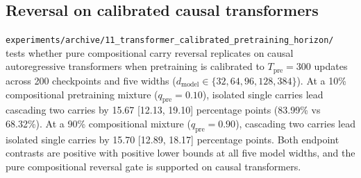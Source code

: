 \subsection{Reversal on calibrated causal transformers}
\label{sec:exp11_ranking}
\texttt{experiments/archive/11\_transformer\_calibrated\_pretraining\_horizon/} tests whether pure compositional carry reversal replicates on causal autoregressive transformers when pretraining is calibrated to $T_{\text{pre}}=300$ updates across 200 checkpoints and five widths ($d_{\text{model}} \in \{32, 64, 96, 128, 384\}$).
At a 10\% compositional pretraining mixture ($q_{\text{pre}}=0.10$), isolated single carries lead cascading two carries by 15.67 [12.13, 19.10] percentage points (83.99\% vs 68.32\%).
At a 90\% compositional mixture ($q_{\text{pre}}=0.90$), cascading two carries lead isolated single carries by 15.70 [12.89, 18.17] percentage points.
Both endpoint contrasts are positive with positive lower bounds at all five model widths, and the pure compositional reversal gate is supported on causal transformers.
